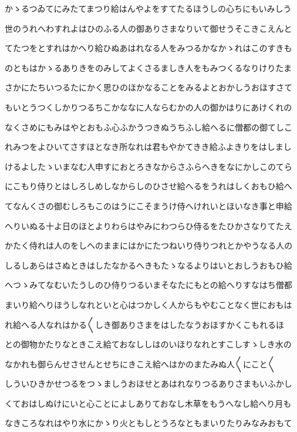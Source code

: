 \documentclass[a4paper,11pt,landscape]{ltjtarticle}
\begin{document}
かゝるつゐてにみたてまつり給はんやよをすてたるほうしの心ちにもいみしう
\par\medskip
世のうれへわすれよはひのふる人の御ありさまなりいて御せうそこきこえんと
\par\medskip
てたつをとすれはかへり給ひぬあはれなる人をみつるかなかゝれはこのすきも
\par\medskip
のともはかゝるありきをのみしてよくさるましき人をもみつくるなりけりたま
\par\medskip
さかにたちいつるたにかく思ひのほかなることをみるよとおかしうおほすさて
\par\medskip
もいとうつくしかりつるちこかななに人ならむかの人の御かはりにあけくれの
\par\medskip
なくさめにもみはやとおもふ心ふかうつきぬうちふし給へるに僧都の御てしこ
\par\medskip
れみつをよひいてさすほとなき所なれは君もやかてきき給ふよきりをはしまし
\par\medskip
けるよしたゝいまなむ人申すにおとろきなからさふらへきをなにかしこのてら
\par\medskip
にこもり侍りとはしろしめしなからしのひさせ給へるをうれはしくおもひ給へ
\par\medskip
てなんくさの御むしろもこのはうにこそまうけ侍へけれいとほいなき事と申給
\par\medskip
へりいぬる十よ日のほとよりわらはやみにわつらひ侍るをたひかさなりてたえ
\par\medskip
かたく侍れは人のをしへのままにはかにたつねいり侍りつれとかやうなる人の
\par\medskip
しるしあらはさぬときはしたなかるへきもたゝなるよりはいとおしうおもひ給
\par\medskip
へつゝみてなむいたうしのひ侍りつるいまそなたにもとの給へりすなはち僧都
\par\medskip
まいり給へりほうしなれといと心はつかしく人からもやむことなく世におもは
\par\medskip
れ給へる人なれはかる〱しき御ありさまをはしたなうおほすかくこもれるほ
\par\medskip
との御物かたりなときこえ給ておなししはのいほりなれとすこしすゝしき水の
\par\medskip
なかれも御らんせさせんとせちにきこえ給へはかのまたみぬ人〱にこと〱
\par\medskip
しういひきかせつるをつゝましうおほせとあはれなりつるありさまもいふかし
\par\medskip
くておはしぬけにいと心ことによしありておなし木草をもうへなし給へり月も
\par\medskip
なきころなれはやり水にかゝり火ともしとうろなともまいりたりみなみおもて
\end{document}
